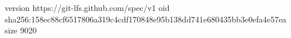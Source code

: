 version https://git-lfs.github.com/spec/v1
oid sha256:158ec88cf6517806a319c4cdf170848e95b138dd741e680435bb3e0efa4e57ea
size 9020
